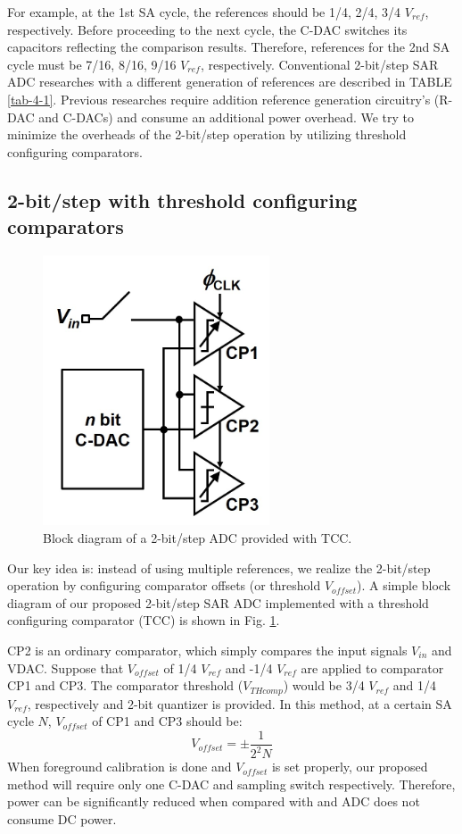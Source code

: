 For example, at the 1st SA cycle, the references should be 1/4, 2/4, 3/4 $V_{ref}$, respectively. Before proceeding to the next cycle, the C-DAC switches its capacitors reflecting the comparison results. Therefore, references for the 2nd SA cycle must be 7/16, 8/16, 9/16 $V_{ref}$, respectively. Conventional 2-bit/step SAR ADC researches with a different generation of references are described in TABLE \ref{tab-4-1}. Previous researches require addition reference generation circuitry's (R-DAC and C-DACs) and consume an additional power overhead.
We try to minimize the overheads of the 2-bit/step operation by utilizing threshold configuring comparators.


\subsection{2-bit/step with threshold configuring comparators}

\begin{figure}
\centering
  \includegraphics[width=0.6\textwidth]{figure/chap4/fig1.jpg}
  \caption{Block diagram of a 2-bit/step ADC provided with TCC.}
  \label{fig-4-1}
\end{figure}

Our key idea is: instead of using multiple references, we realize the 2-bit/step operation by configuring comparator offsets (or threshold $V_{offset}$). A simple block diagram of our proposed 2-bit/step SAR ADC implemented with a threshold configuring comparator (TCC) is shown in Fig. \ref{fig-4-1}. 

CP2 is an ordinary comparator, which simply compares the input signals $V_{in}$ and VDAC. Suppose that $V_{offset}$ of 1/4 $V_{ref}$ and -1/4 $V_{ref}$ are applied to comparator CP1 and CP3. The comparator threshold ($V_{THcomp}$) would be 3/4 $V_{ref}$ and 1/4 $V_{ref}$, respectively and 2-bit quantizer is provided. In this method, at a certain SA cycle $N$, $V_{offset}$ of CP1 and CP3 should be:
\begin{equation}
    V_{offset} = \pm \frac{1}{2^2N}
\end{equation}
When foreground calibration is done and $V_{offset}$ is set properly, our proposed method will require only one C-DAC and sampling switch respectively. Therefore, power can be significantly reduced when compared with \cite{cao200932} and ADC does not consume DC power. 

